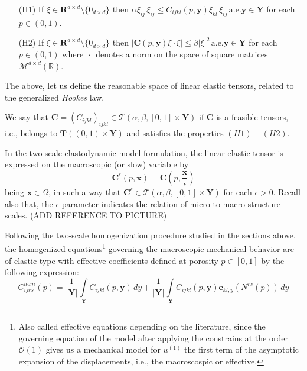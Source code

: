 \begin{enumerate}
    \item[(H1)] If $\xi \in \mathbf{R}^{d\times d} \setminus \{0_{d \times d}\}$ then $\alpha \xi_{ij} \, \xi_{ij} \leq C_{ijkl}(p,\mathbf{y})  \xi_{kl}\,\xi_{ij}\, \text{a.e.} \mathbf{y} \in \mathbf{Y}$ for each $p \in (0,1)$.
    \item[(H2)] If $\xi \in \mathbf{R}^{d\times d} \setminus \{0_{d \times d}\}$ then $\vert \mathbf{C}(p,\mathbf{y}) \xi\cdot \xi \vert \leq \beta \vert \xi \vert^2 \, \text{a.e.}\mathbf{y} \in \mathbf{Y}$ for each $p \in (0,1)$ where $\vert \cdot \vert$ denotes a norm on the space of square matrices $\mathcal{M}^{d\times d}(\mathbb{R})$.
\end{enumerate}
The above, let us define the reasonable space of linear elastic tensors, related to the generalized \textit{Hookes} law.
\begin{defn}
We say that $\mathbf{C} = (C_{ijkl})_{ijkl} \in \mathcal{T}(\alpha, \beta, [0,1]\times \mathbf{Y})$
if $\mathbf{C}$ is a feasible tensors, i.e., belongs to $\mathbf{T}((0,1)\times \mathbf{Y})$ and satisfies the properties $(H1)-(H2)$.
\end{defn}
\begin{rem}
In the two-scale elastodynamic model formulation, the linear elastic tensor is expressed on the macroscopic (or slow) variable by
\begin{equation*}
    \mathbf{C}^{\epsilon}(p,\mathbf{x}) =\mathbf{C}(p,\frac{\mathbf{x}}{\epsilon})
\end{equation*} being $\mathbf{x}\in \Omega$, in such a way that $\mathbf{C}^{\epsilon} \in \mathcal{T}(\alpha, \beta, [0,1]\times \mathbf{Y})$ for each $\epsilon >0$. Recall also that, the $\epsilon$ parameter indicates the relation of micro-to-macro structure scales. (ADD REFERENCE TO PICTURE)
\end{rem}
Following the two-scale homogenization procedure studied in the sections above, the homogenized equations\footnote{Also called effective equations depending on the literature, since the governing equation of the model after applying the constrains at the order $\mathcal{O}(1)$ gives us a mechanical model for $u^{(1)}$ the first term of the asymptotic expansion of the displacements, i.e., the macroscospic or effective.} governing the macroscopic mechanical behavior are of elastic type with effective coefficients defined at porosity $p \in [0,1]$ by the following expression:
\begin{equation}
    \label{eq:homogenized-coeff}
    C^{hom}_{ijrs}(p) = \frac{1}{\vert \mathbf{Y}\vert} \int\limits_{\mathbf{Y}} C_{ijkl}(p,\mathbf{y}) \, dy + \frac{1}{\vert \mathbf{Y}\vert} \int\limits_{\mathbf{Y}} C_{ijkl}(p,\mathbf{y}) \mathbf{e}_{kl,y}( N^{rs}(p))\,dy
\end{equation}
